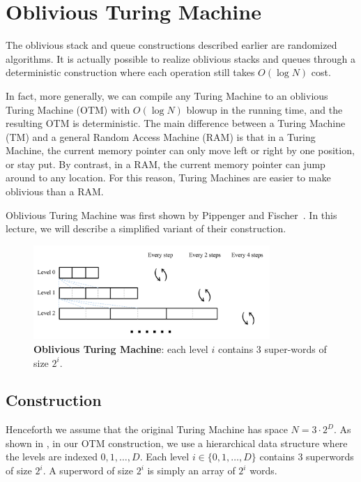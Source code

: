 \documentclass[11pt]{article}
\begin{document}
\section{Oblivious Turing Machine}

The oblivious stack and queue constructions
described earlier 
are randomized algorithms. 
It is actually possible to realize oblivious stacks
and queues through a deterministic 
construction where each operation still takes $O(\log N)$ cost. 

In fact, more generally, we can compile any Turing Machine
to an oblivious Turing Machine (OTM) with $O(\log N)$
blowup in the running time, and the resulting
OTM is deterministic.
The main difference between a Turing Machine (TM) and a general Random 
Access Machine (RAM) 
is that in a 
Turing Machine, the current memory pointer 
can only move left
or right by one position, or stay put. 
By contrast, in a RAM, the current memory 
pointer can jump around to any location.
For this reason, Turing Machines are easier 
to make oblivious than a RAM. 

Oblivious Turing Machine was first shown by 
Pippenger and Fischer~\cite{otm}. In this lecture, we will describe
a simplified variant of their construction.


\begin{figure}
    \centering
    \includegraphics[width=0.8\textwidth]{otm}
    \caption{{\bf Oblivious Turing Machine}: each level $i$ contains
3 super-words of size $2^i$. }
    \label{fig:otm}
\end{figure}

\subsection{Construction}
Henceforth we assume that the original Turing Machine 
has space $N = 3 \cdot 2^D$.
As shown in , 
in our OTM construction, we use a hierarchical data structure
where the levels are indexed $0, 1, \ldots, D$.
Each level $i \in \{0, 1, \ldots, D\}$ 
contains 3 superwords of size $2^i$.
A superword 
of size $2^i$ is simply an array of $2^i$ words.
\end{document}
